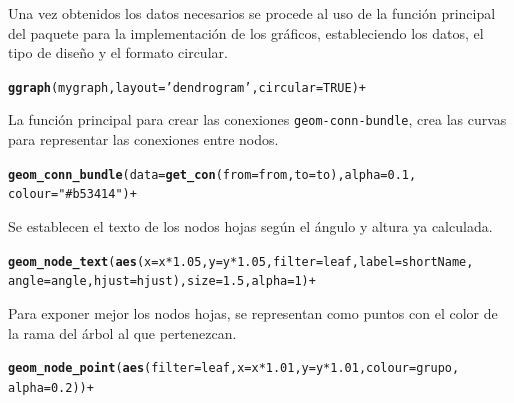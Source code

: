 \documentclass{article}\usepackage[]{graphicx}\usepackage[]{color}
\makeatletter
\newcommand{\hlstr}[1]{\textcolor[rgb]{0.192,0.494,0.8}{#1}}%
\newcommand{\hlkwd}[1]{\textcolor[rgb]{0.737,0.353,0.396}{\textbf{#1}}}%
\newenvironment{kframe}{%
 \def\at@end@of@kframe{}%
 \ifinner\ifhmode%
  \def\at@end@of@kframe{\end{minipage}}%
  \begin{minipage}{\columnwidth}%
 \fi\fi%
 \def\FrameCommand##1{\hskip\@totalleftmargin \hskip-\fboxsep
 \colorbox{shadecolor}{##1}\hskip-\fboxsep
     \hskip-\linewidth \hskip-\@totalleftmargin \hskip\columnwidth}%
 \MakeFramed {\advance\hsize-\width
   \@totalleftmargin\z@ \linewidth\hsize
   \@setminipage}}%
 {\par\unskip\endMakeFramed%
 \at@end@of@kframe}
\newenvironment{knitrout}{}{} %
\makeatother
\begin{document}
Una vez obtenidos los datos necesarios se procede al uso de la funci\'on principal del paquete para la implementaci\'on de los gr\'aficos, estableciendo los datos, el tipo de dise\~no y el formato circular.
\begin{knitrout}
\color{fgcolor}\begin{kframe}
\begin{alltt}
\hlkwd{ggraph}(mygraph, layout = \hlstr{'dendrogram'}, circular = TRUE) + 
\end{alltt}
\end{kframe}
\end{knitrout}
La funci\'on principal para crear las conexiones \texttt{geom-conn-bundle}, crea las curvas para representar las conexiones entre nodos.
\begin{knitrout}
\color{fgcolor}\begin{kframe}
\begin{alltt}
  \hlkwd{geom_conn_bundle}(data = \hlkwd{get_con}(from = from, to = to), alpha = 0.1, 
                     colour=\hlstr{"#b53414"}) + 
\end{alltt}
\end{kframe}
\end{knitrout}
Se establecen el texto de los nodos hojas seg\'un el \'angulo y altura ya calculada.
\begin{knitrout}
\color{fgcolor}\begin{kframe}
\begin{alltt}
  \hlkwd{geom_node_text}(\hlkwd{aes}(x = x*1.05, y=y*1.05, filter = leaf, label=shortName,
                       angle = angle, hjust=hjust), size=1.5, alpha=1) +
\end{alltt}
\end{kframe}
\end{knitrout}
Para exponer mejor los nodos hojas, se representan como puntos con el color de la rama del \'arbol al que pertenezcan.
\begin{knitrout}
\color{fgcolor}\begin{kframe}
\begin{alltt}
  \hlkwd{geom_node_point}(\hlkwd{aes}(filter = leaf, x = x*1.01, y=y*1.01, colour=grupo,
                      alpha=0.2)) +
\end{alltt}
\end{kframe}
\end{knitrout}
\end{document}
